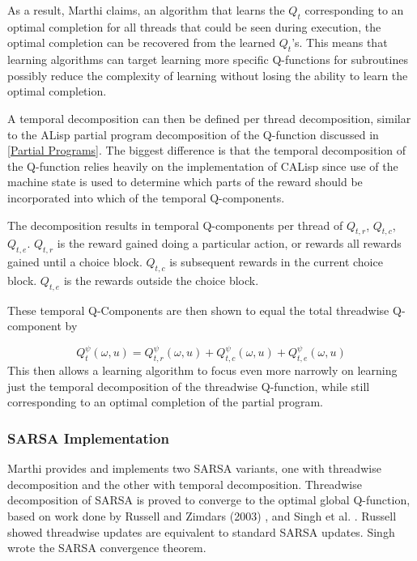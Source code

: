 \documentclass[jair,twoside,11pt,theapa]{article}
\begin{document}
As a result, Marthi claims, an algorithm that learns the $Q_t$ corresponding to an optimal completion for all threads that could be seen during execution, the optimal completion can be recovered from the learned $Q_t$'s. This means that learning algorithms can target learning more specific Q-functions for subroutines possibly reduce the complexity of learning without losing the ability to learn the optimal completion. 

A temporal decomposition can then be defined per thread decomposition, similar to the ALisp partial program decomposition of the Q-function discussed in \ref{Partial Programs}. The biggest difference is that the temporal decomposition of the Q-function relies heavily on the implementation of CALisp since use of the machine state is used to determine which parts of the reward should be incorporated into which of the temporal Q-components. 

The decomposition results in temporal Q-components per thread of $Q_{t,r}$, $Q_{t,c}$, $Q_{t,e}$. $Q_{t,r}$ is the reward gained doing a particular action, or rewards all rewards gained until a choice block. $Q_{t,c}$ is subsequent rewards in the current choice block. $Q_{t,e}$ is the rewards outside the choice block.

These temporal Q-Components are then shown to equal the total threadwise Q-component by 

\begin{equation}
Q^{\psi}_t (\omega, u) =  Q^{\psi}_{t,r} (\omega, u) + Q^{\psi}_{t,c} (\omega, u) + Q^{\psi}_{t,e} (\omega, u)
\end{equation}  
This then allows a learning algorithm to focus even more narrowly on learning just the temporal decomposition of the threadwise Q-function, while still corresponding to an optimal completion of the partial program. 


\subsubsection{SARSA Implementation}
Marthi provides and implements two SARSA variants, one with threadwise decomposition and the other with temporal decomposition. Threadwise decomposition of SARSA is proved to converge to the optimal global Q-function, based on work done by Russell and Zimdars (2003) \cite{Russell:2003}, and Singh et al. \cite{Singh:2000}. Russell showed threadwise updates are equivalent to standard SARSA updates. Singh wrote the SARSA convergence theorem. 
\end{document}

